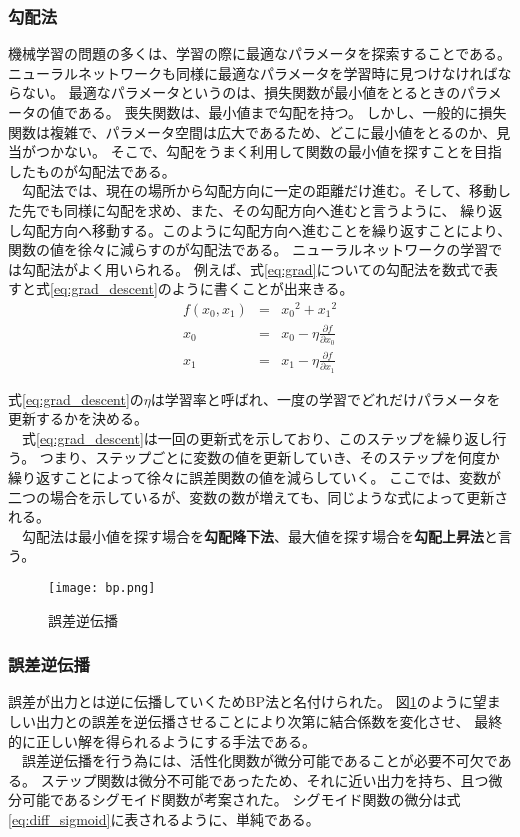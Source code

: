 \documentclass[twocolumn,fleqn]{jsarticle}
\begin{document}
\subsubsection{勾配法}
機械学習の問題の多くは、学習の際に最適なパラメータを探索することである。
ニューラルネットワークも同様に最適なパラメータを学習時に見つけなければならない。
最適なパラメータというのは、損失関数が最小値をとるときのパラメータの値である。
喪失関数は、最小値まで勾配を持つ。
しかし、一般的に損失関数は複雑で、パラメータ空間は広大であるため、どこに最小値をとるのか、見当がつかない。
そこで、勾配をうまく利用して関数の最小値を探すことを目指したものが勾配法である。\\
　勾配法では、現在の場所から勾配方向に一定の距離だけ進む。そして、移動した先でも同様に勾配を求め、また、その勾配方向へ進むと言うように、
繰り返し勾配方向へ移動する。このように勾配方向へ進むことを繰り返すことにより、関数の値を徐々に減らすのが勾配法である。
ニューラルネットワークの学習では勾配法がよく用いられる。
例えば、式\ref{eq:grad}についての勾配法を数式で表すと式\ref{eq:grad_descent}のように書くことが出来きる。
\begin{eqnarray}
    f(x_0,x_1) & = & {x_0}^2 + {x_1}^2 \label{eq:grad} \\
    x_0 & = & x_0 - \eta\frac{\partial f}{\partial x_0} \nonumber \\
    x_1 & = & x_1 - \eta\frac{\partial f}{\partial x_1} \label{eq:grad_descent}
\end{eqnarray}


式\ref{eq:grad_descent}の$\eta$は学習率と呼ばれ、一度の学習でどれだけパラメータを更新するかを決める。\\
　式\ref{eq:grad_descent}は一回の更新式を示しており、このステップを繰り返し行う。
つまり、ステップごとに変数の値を更新していき、そのステップを何度か繰り返すことによって徐々に誤差関数の値を減らしていく。
ここでは、変数が二つの場合を示しているが、変数の数が増えても、同じような式によって更新される。\\
　勾配法は最小値を探す場合を{\bf 勾配降下法}、最大値を探す場合を{\bf 勾配上昇法}と言う。

\begin{figure}[b]
\centering
\texttt{[image: bp.png]}
\caption{誤差逆伝播}
\label{fig:bp}
\end{figure}

\subsubsection{誤差逆伝播}
誤差が出力とは逆に伝播していくためBP法と名付けられた。
図\ref{fig:bp}のように望ましい出力との誤差を逆伝播させることにより次第に結合係数を変化させ、
最終的に正しい解を得られるようにする手法である。\\
　誤差逆伝播を行う為には、活性化関数が微分可能であることが必要不可欠である。
ステップ関数は微分不可能であったため、それに近い出力を持ち、且つ微分可能であるシグモイド関数が考案された。
シグモイド関数の微分は式\ref{eq:diff_sigmoid}に表されるように、単純である。
\end{document}
